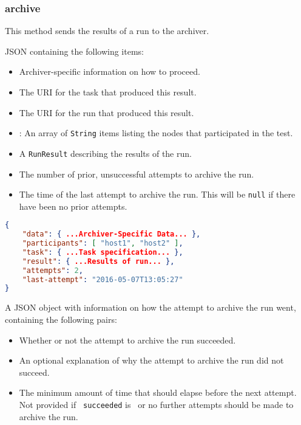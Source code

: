 \documentclass[10pt,titlepage]{article}
\begin{document}
\subsubsection{archive}

This method sends the results of a run to the archiver.

 JSON containing the following items:

\begin{itemize}
\item {} Archiver-specific information on how to proceed.

\item {} The URI for the task that produced
  this result.

\item {} The URI for the run that produced
  this result.

\item{}: An array of {\tt String} items
  listing the nodes that participated in the test.

\item {} A {\tt RunResult} describing
  the results of the run.

\item {} The number of prior, unsuccessful
  attempts to archive the run.

\item {} The time of the last attempt
  to archive the run.  This will be {\tt null} if there have been no
  prior attempts.
\end{itemize}

\example
\begin{lstlisting}[language=json,firstnumber=1]
{
    "data": { ...Archiver-Specific Data... },
    "participants": [ "host1", "host2" ],
    "task": { ...Task specification... },
    "result": { ...Results of run... },
    "attempts": 2,
    "last-attempt": "2016-05-07T13:05:27"
}
\end{lstlisting}


 A JSON object with information on how
the attempt to archive the run went, containing the following pairs:

\begin{itemize}
\item {} Whether or not the attempt to archive
the run succeeded.
\item {} An optional explanation of why the
  attempt to archive the run did not succeed.
\item {} The minimum amount of time that
  should elapse before the next attempt.  Not provided if {\tt
    succeeded} is \true\  or no further attempts should be made to
  archive the run.
\end{itemize}
\end{document}
